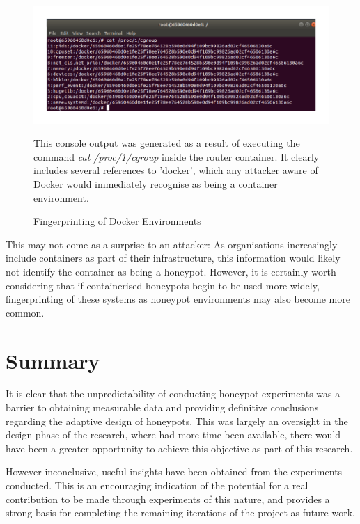 \begin{figure}[ht]
      \centering
      \includegraphics[width=160mm, scale=1]{Images/Fingerprinting_Docker_Containers__1_.png}
      \caption{Fingerprinting of Docker Environments} 
      \medskip
      \small
		This console output was generated as a result of executing the command \textit{cat /proc/1/cgroup} inside the router container. It clearly includes several references to 'docker', which any attacker aware of Docker would immediately recognise as being a container environment.
\label{fig:DockerFingerprintingCommand}
\end{figure}


This may not come as a surprise to an attacker: As organisations increasingly include containers as part of their infrastructure, this information would likely not identify the container as being a honeypot. However, it is certainly worth considering that if containerised honeypots begin to be used more widely, fingerprinting of these systems as honeypot environments may also become more common. 


\section{Summary} \label{SummaryOfChapter6}

It is clear that the unpredictability of conducting honeypot experiments was a barrier to obtaining measurable data and providing definitive conclusions regarding the adaptive design of honeypots. This was largely an oversight in the design phase of the research, where had more time been available, there would have been a greater opportunity to achieve this objective as part of this research.

However inconclusive, useful insights have been obtained from the experiments conducted. This is an encouraging indication of the potential for a real contribution to be made through experiments of this nature, and provides a strong basis for completing the remaining iterations of the project as future work.